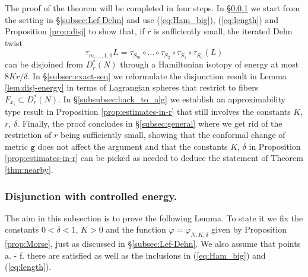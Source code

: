 The proof of the theorem will be completed in four steps. In \S\ref{sububsec:disjunction-we} we start from the setting in \S\ref{subsec:Lef-Dehn} and use (\ref{eq:Ham_big}), (\ref{eq:length}) and Proposition \ref{prop:disj} to show that, if $r$ is sufficiently small,  the iterated Dehn twist $$\tau_{m,\ldots, 1,0}L= \tau_{S_{m}} \circ \ldots  \circ \tau_{S_{2}}\circ \tau_{S_{1}}\circ \tau_{S_{0}}(L)$$ can be disjoined from $D^{\ast}_{r}(N)$ through a Hamiltonian isotopy of energy 
at most $8Kr/\delta$.  In \S\ref{subsec:exact-seq} we reformulate the disjunction result in Lemma \ref{lem:disj-energy} in terms of Lagrangian spheres that restrict to fibers $F_{x_{i}}\subset D^{\ast}_{r}(N)$. In \S\ref{subsubsec:back_to_alg} we establish an approximability type result in Proposition \ref{prop:estimates-in-r} that still involves the constants $K$, $r$, $\delta$. Finally, the proof concludes in \S\ref{subsec:general} where we get rid of the restriction of $r$ being sufficiently small, showing that the conformal change of metric   $\texttt{g}$ does not affect the argument and that
the constants $K$, $\delta$ in Proposition \ref{prop:estimates-in-r} can be picked as needed to deduce the statement of  Theorem \ref{thm:nearby}.
\subsubsection{Disjunction with controlled energy.}\label{sububsec:disjunction-we}
The aim in this subsection is to prove the following Lemma. To state it we fix
the constants $0<\delta < 1$, $K>0$
 and the function $\varphi=\varphi_{N,K,\delta}$ given  by Proposition \ref{prop:Morse}, just as discussed in \S\ref{subsec:Lef-Dehn}.  We
also assume that points a. - f. there are satisfied as well as the inclusions in (\ref{eq:Ham_big}) and (\ref{eq:length}). 

